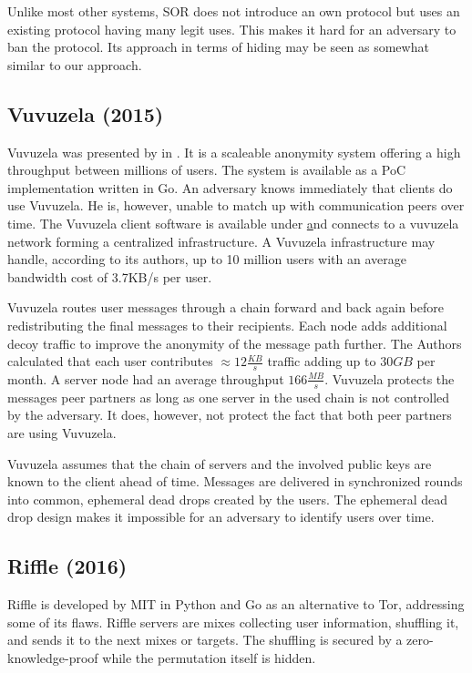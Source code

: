 Unlike most other systems, SOR does not introduce an own protocol but uses an existing protocol having many legit uses. This makes it hard for an adversary to ban the protocol. Its approach in terms of hiding may be seen as somewhat similar to our approach.

\subsection{Vuvuzela (2015)}
Vuvuzela was presented by \citeauthor{van2015vuvuzela} in \cite{van2015vuvuzela}. It is a scaleable anonymity system offering a high throughput between millions of users. The system is available as a PoC implementation written in Go. An adversary knows immediately that clients do use Vuvuzela. He is, however, unable to match up with communication peers over time. The Vuvuzela client software is available under \href{https://vuvuzela.io/} and connects to a vuvuzela network forming a centralized infrastructure. A Vuvuzela infrastructure may handle, according to its authors, up to 10 million users with an average bandwidth cost of 3.7KB/s per user.

Vuvuzela routes user messages through a chain forward and back again before redistributing the final messages to their recipients. Each node adds additional decoy traffic to improve the anonymity of the message path further. The Authors calculated that each user contributes $\approx 12 \frac{KB}{s}$ traffic adding up to $30 GB$ per month. A server node had an average throughput $166 \frac{MB}{s}$. Vuvuzela protects the messages peer partners as long as one server in the used chain is not controlled by the adversary. It does, however, not protect the fact that both peer partners are using Vuvuzela. 

Vuvuzela assumes that the chain of servers and the involved public keys are known to the client ahead of time. Messages are delivered in synchronized rounds into common, ephemeral dead drops created by the users. The ephemeral dead drop design makes it impossible for an adversary to identify users over time. 

\subsection{Riffle (2016)} %
Riffle\cite{kwon2016riffle} is developed by MIT in Python and Go as an alternative to Tor, addressing some of its flaws. Riffle servers are mixes collecting user information, shuffling it, and sends it to the next mixes or targets. The shuffling is secured by a zero-knowledge-proof while the permutation itself is hidden.

